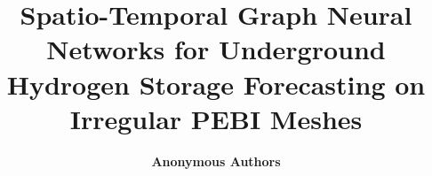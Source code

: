\documentclass[10pt,twocolumn]{article}
\title{\textbf{Spatio-Temporal Graph Neural Networks for Underground Hydrogen Storage Forecasting on Irregular PEBI Meshes}}
\author{\textbf{Anonymous Authors}}
\affil{Anonymous Institution}
\date{}
\begin{document}
\maketitle
















\clearpage
\appendix




\small


\end{document}
